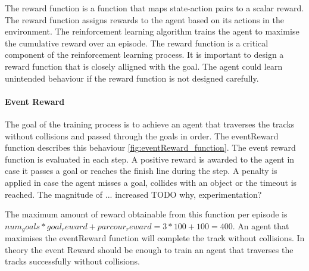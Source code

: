 The reward function is a function that maps state-action pairs to a scalar reward. The reward function assigns rewards to the agent based on its actions in the environment. The reinforcement learning algorithm trains the agent to maximise the cumulative reward over an episode. The reward function is a critical component of the reinforcement learning process. It is important to design a reward function that is closely alligned with the goal. The agent could learn unintended behaviour if the reward function is not designed carefully.

\paragraph*{Event Reward}
The goal of the training process is to achieve an agent that traverses the tracks without collisions and passed through the goals in order. The eventReward function describes this behaviour \ref{fig:eventReward_function}. The event reward function is evaluated in each step. A positive reward is awarded to the agent in case it passes a goal or reaches the finish line during the step. A penalty is applied in case the agent misses a goal, collides with an object or the timeout is reached. The magnitude of ... increased TODO why, experimentation?

The maximum amount of reward obtainable from this function per episode is $num_goals * goal_reward + parcour_reward = 3 * 100 + 100 = 400$. An agent that maximises the eventReward function will complete the track without collisions. In theory the event Reward should be enough to train an agent that traverses the tracks successfully without collisions.




